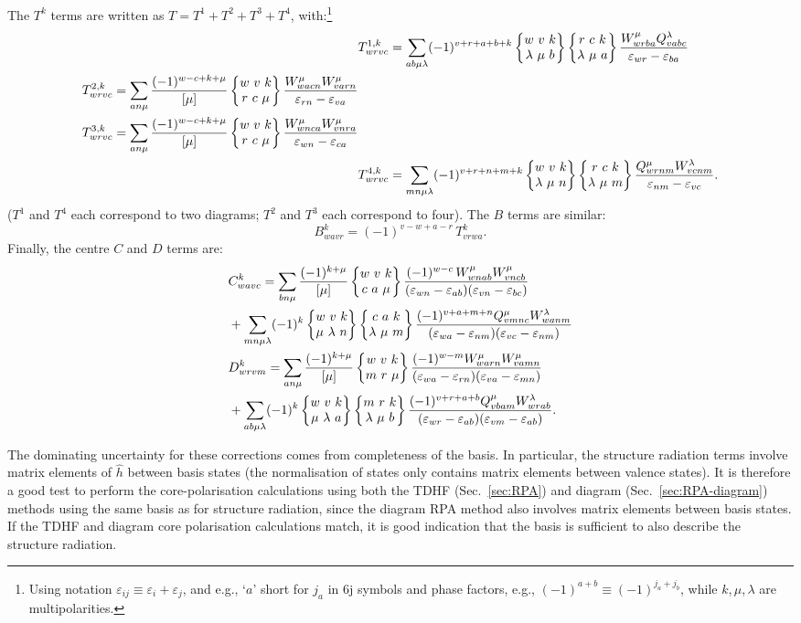 \documentclass[10pt,twocolumn,a4paper]{article}%
\newcommand{\sixjs}[6]{\ensuremath{\begin{Bmatrix}#1~#2~#3\\#4~#5~#6\end{Bmatrix}}}	%
\newcommand{\be}{\begin{equation}}
\newcommand{\ee}{\end{equation}}
\def\en{\ensuremath{\varepsilon}}
\begin{document}
The $T^k$ terms are written as
$T=T^1+T^2+T^3+T^4$, with:\footnote{Using notation
$\en_{ij}\equiv\en_i+\en_j$, and e.g., `$a$' short for $j_a$ in 6j symbols and phase factors, e.g.,
$(-1)^{a+b}\equiv(-1)^{j_a + j_b}$, while $k$,\,$\mu$,\,$\lambda$ are multipolarities.}
\begin{align}
&\notag
T^{1,k}_{wrvc} = 
\sum_{ab\mu\lambda}(-1)^{v+r+a+b+k}
\sixjs{w}{v}{k}{\lambda}{\mu}{b}
\sixjs{r}{c}{k}{\lambda}{\mu}{a}
\frac{W^\mu_{wrba}Q^\lambda_{vabc}}{\en_{wr}-\en_{ba}}
\\
\begin{split}
&T^{2,k}_{wrvc} = 
\sum_{an\mu}\frac{(-1)^{w-c+k+\mu}}{[\mu]}
\sixjs{w}{v}{k}{r}{c}{\mu}
\frac{W^\mu_{wacn}W^\mu_{varn}}{\en_{rn}-\en_{va}}
\\
&T^{3,k}_{wrvc} = 
\sum_{an\mu}\frac{(-1)^{w-c+k+\mu}}{[\mu]}
\sixjs{w}{v}{k}{r}{c}{\mu}
\frac{W^\mu_{wnca}W^\mu_{vnra}}{\en_{wn}-\en_{ca}}
\end{split}
\\
&\notag
T^{4,k}_{wrvc} = 
\sum_{mn\mu\lambda}(-1)^{v+r+n+m+k}
\sixjs{w}{v}{k}{\lambda}{\mu}{n}
\sixjs{r}{c}{k}{\lambda}{\mu}{m}
\frac{Q^\mu_{wrnm}W^\lambda_{vcnm}}{\en_{nm}-\en_{vc}}.
\end{align}
($T^1$ and $T^4$ each correspond to two diagrams; $T^2$ and $T^3$ each correspond to four).
The $B$ terms are similar:
\be
B^{k}_{wavr} = (-1)^{v-w+a-r}\,T^{k}_{vrwa}.
\ee
%
Finally, the centre $C$ and $D$ terms are:
\begin{align}
&\notag
C^{k}_{wavc} = 
\sum_{bn\mu}\frac{(-1)^{k+\mu}}{[\mu]}
\sixjs{w}{v}{k}{c}{a}{\mu}
\frac{(-1)^{w-c}\,W^\mu_{wnab}W^\mu_{vncb}}{(\en_{wn}-\en_{ab})(\en_{vn}-\en_{bc})}
\\
&+\sum_{mn\mu\lambda}(-1)^{k}
\sixjs{w}{v}{k}{\mu}{\lambda}{n}
\sixjs{c}{a}{k}{\lambda}{\mu}{m}
\frac{(-1)^{v+a+m+n}Q^\mu_{vmnc}W^\lambda_{wanm}}{(\en_{wa}-\en_{nm})(\en_{vc}-\en_{nm})}
\\
&\notag
D^{k}_{wrvm} = 
\sum_{an\mu}\frac{(-1)^{k+\mu}}{[\mu]}
\sixjs{w}{v}{k}{m}{r}{\mu}
\frac{(-1)^{w-m}W^\mu_{warn}W^\mu_{vamn}}{(\en_{wa}-\en_{rn})(\en_{va}-\en_{mn})}
\\
&\notag+
\sum_{ab\mu\lambda}(-1)^{k}
\sixjs{w}{v}{k}{\mu}{\lambda}{a}
\sixjs{m}{r}{k}{\lambda}{\mu}{b}
\frac{(-1)^{v+r+a+b}Q^\mu_{vbam}W^\lambda_{wrab}}{(\en_{wr}-\en_{ab})(\en_{vm}-\en_{ab})}.
\end{align}


The dominating uncertainty for these corrections comes from completeness of the basis.
In particular, the structure radiation terms involve matrix elements of $\hat h$ between basis states (the normalisation of states only contains matrix elements between valence states).
It is therefore a good test to perform the core-polarisation calculations using both the TDHF (Sec.~\ref{sec:RPA}) and diagram (Sec.~\ref{sec:RPA-diagram}) methods using the same basis as for structure radiation, since the diagram RPA method also involves matrix elements between basis states.
If the TDHF and diagram core polarisation calculations match, it is good indication that the basis is sufficient to also describe the structure radiation.
\end{document}
